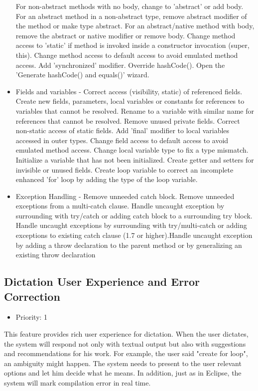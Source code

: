 \begin{itemize}
	For non-abstract methods with no body, change to 'abstract' or add body. For an abstract method in a non-abstract type, remove abstract modifier of the method or make type abstract. For an abstract/native method with body, remove the abstract or native modifier or remove body. Change method access to 'static' if method is invoked inside a constructor invocation (super, this). Change method access to default access to avoid emulated method access.  Add 'synchronized' modifier. Override hashCode(). Open the 'Generate hashCode() and equals()' wizard.
	\item Fields and variables - Correct access (visibility, static) of referenced fields. Create new fields, parameters, local variables or constants for references to variables that cannot be resolved. Rename to a variable with similar name for references that cannot be resolved. Remove unused private fields. Correct non-static access of static fields. Add 'final' modifier to local variables accessed in outer types. Change field access to default access to avoid emulated method access. Change local variable type to fix a type mismatch. Initialize a variable that has not been initialized. Create getter and setters for invisible or unused fields. Create loop variable to correct an incomplete enhanced 'for' loop by adding the type of the loop variable.
	\item Exception Handling - Remove unneeded catch block. Remove unneeded exceptions from a multi-catch clause. Handle uncaught exception by surrounding with try/catch or adding catch block to a surrounding try block. Handle uncaught exceptions by surrounding with try/multi-catch or adding exceptions to existing catch clause (1.7 or higher).Handle uncaught exception by adding a throw declaration to the parent method or by generalizing an existing throw declaration
\end{itemize}
\subsection{Dictation User Experience and Error Correction}
\begin{itemize}
	\item Priority: 1
\end{itemize}
This feature provides rich user experience for dictation. When the user dictates, the system will respond not only with textual output but also with suggestions and recommendations for his work. For example, the user said "create for loop", an ambiguity might happen. The system needs to present to the user relevant options and let him decide what he means. In addition, just as in Eclipse, the system will mark compilation error in real time.
